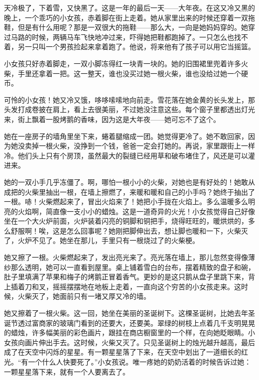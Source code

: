 \documentclass[12pt,UTF-8,openany]{ctexbook}
\begin{document}
\begin{Large}
    
    天冷极了，下着雪，又快黑了。这是一年的最后一天——大年夜。在这又冷又黑的晚上，一个乖巧的小女孩，赤着脚在街上走着。她从家里出来的时候还穿着一双拖鞋，但是有什么用呢？那是一双很大的拖鞋——那么大，一向是她妈妈穿的。她穿过马路的时候，两辆马车飞快地冲过来，吓得她把鞋都跑掉了。一只怎么也找不着，另一只叫一个男孩捡起来拿着跑了。他说，将来他有了孩子可以用它当摇篮。
    
    小女孩只好赤着脚走，一双小脚冻得红一块青一块的。她的旧围裙里兜着许多火柴，手里还拿着一把。这一整天，谁也没买过她一根火柴，谁也没给过她一个硬币。
    
    可怜的小女孩！她又冷又饿，哆哆嗦嗦地向前走。雪花落在她金黄的长头发上，那头发打成卷披在肩上，看上去很美丽，不过她没注意这些。每个窗子里都透出灯光来，街上飘着一股烤鹅的香味，因为这是大年夜——她可忘不了这个。
    
    她在一座房子的墙角里坐下来，蜷着腿缩成一团。她觉得更冷了。她不敢回家，因为她没卖掉一根火柴，没挣到一个钱，爸爸一定会打她的。再说，家里跟街上一样冷。他们头上只有个房顶，虽然最大的裂缝已经用草和破布堵住了，风还是可以灌进来。
    
    她的一双小手几乎冻僵了。啊，哪怕一根小小的火柴，对她也是有好处的！她敢从成把的火柴里抽出一根，在墙上擦燃了，来暖和暖和自己的小手吗？她终于抽出了一根。哧！火柴燃起来了，冒出火焰来了！她把小手拢在火焰上。多么温暖多么明亮的火焰啊，简直像一支小小的蜡烛。这是一道奇异的火光！小女孩觉得自己好像坐在一个大火炉前面，火炉装着闪亮的铜脚和铜把手，烧得旺旺的，暖烘烘的，多么舒服啊！唉，这是怎么回事呢？她刚把脚伸出去，想让脚也暖和一下，火柴灭了，火炉不见了。她坐在那儿，手里只有一根烧过了的火柴梗。
    
    她又擦了一根。火柴燃起来了，发出亮光来了。亮光落在墙上，那儿忽然变得像薄纱那么透明，她可以一直看到屋里。桌上铺着雪白的台布，摆着精致的盘子和碗，肚子里填满了苹果和梅子的烤鹅正冒着香气。更妙的是这只鹅从盘子里跳下来，背上插着刀和叉，摇摇摆摆地在地板上走着，一直向这个穷苦的小女孩走来。这时候，火柴灭了，她面前只有一堵又厚又冷的墙。
    
    她又擦着了一根火柴。这一回，她坐在美丽的圣诞树下。这棵圣诞树，比她去年圣诞节透过富商家的玻璃门看到的还要大，还要美。翠绿的树枝上点着几千支明晃晃的蜡烛，许多幅美丽的彩色画片，跟挂在商店橱窗里的一个样，在向她眨眼睛。小女孩向画片伸出手去。这时候，火柴又灭了。只见圣诞树上的烛光越升越高，最后成了在天空中闪烁的星星。有一颗星星落了下来，在天空中划出了一道细长的红光。“有一个什么人快要死了。”小女孩说。唯一疼她的奶奶活着的时候告诉过她：一颗星星落下来，就有一个人要离去了。
    

\end{Large}
\end{document}
